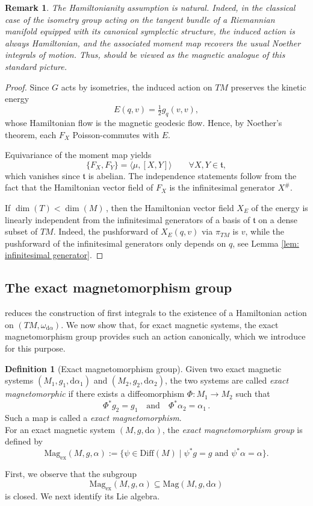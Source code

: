 \documentclass[11pt,reqno]{amsart}
\theoremstyle{plain}
\newtheorem{rem}[thm]{Remark}
\theoremstyle{definition}
\newtheorem{defn}[thm]{Definition}
\numberwithin{equation}{section}
\def\d{\delta}
\def\d{\delta}
\def\d{{\mathrm{d}}}
\def\Diff{\mathrm{Diff}}
\begin{document}
\begin{rem}
The Hamiltonianity assumption is natural. Indeed, in the classical case of the isometry group acting on the tangent bundle of a Riemannian manifold equipped with its canonical symplectic structure, the induced action is always Hamiltonian, and the associated moment map recovers the usual Noether integrals of motion. Thus,  should be viewed as the magnetic analogue of this standard picture.
\end{rem}
\begin{proof}
Since $G$ acts by isometries, the induced action on $TM$ preserves the kinetic energy
\[
E(q,v)=\tfrac12 g_q(v,v),
\]
whose Hamiltonian flow is the magnetic geodesic flow. Hence, by Noether's theorem, each $F_X$ Poisson-commutes with $E$.

Equivariance of the moment map yields
\[
\{F_X,F_Y\}=\langle \mu,[X,Y]\rangle \qquad \forall X,Y\in\mathfrak{t},
\]
which vanishes since $\mathfrak t$ is abelian. The independence statements follow from the fact that the Hamiltonian vector field of $F_X$ is the infinitesimal generator $X^\#$.

If $\dim(T) < \dim(M) \,$, then the Hamiltonian vector field $X_E$ of the energy is linearly independent from the infinitesimal generators of a basis of $\mathfrak{t}$ on a dense subset of $TM$. Indeed, the pushforward of $X_E(q,v)$ via $\pi_{TM}$ is $v$, while the pushforward of the infinitesimal generators only depends on $q$, see Lemma \ref{lem: infinitesimal generator}.
\end{proof}

\subsection{The exact magnetomorphism group}\label{subsection:The exact magnetomorphism group}

 reduces the construction of first integrals to the existence of a Hamiltonian action on $(TM,\omega_{\d\alpha})$. We now show that, for exact magnetic systems, the exact magnetomorphism group provides such an action canonically, which we introduce for this purpose.

\begin{defn}[Exact magnetomorphism group]
\label{defn: exact magn group}Given two exact magnetic systems $(M_1,g_1,\d\alpha_1)$ and $(M_2,g_2,\d\alpha_2)$, the two systems are called \emph{exact magnetomorphic} if there exists a diffeomorphism $\varPhi: M_1 \to M_2$ such that
\[
\varPhi^*g_2=g_1 \quad \text{and} \quad \varPhi^*\alpha_2=\alpha_1\,.
\]Such a map is called a \emph{exact magnetomorphism}.\\

\noindent For an exact magnetic system $(M,g,\d\alpha)$, the \emph{exact magnetomorphism group} is defined by
\[
\mathrm{Mag}_{\mathrm{ex}}(M,g,\alpha)
:=
\{\psi\in\Diff(M)\mid \psi^*g=g \text{ and } \psi^*\alpha=\alpha\}.
\]
\end{defn}
\medskip
First, we observe that the subgroup
\[
\mathrm{Mag}_{\mathrm{ex}}(M,g,\alpha)\subseteq \mathrm{Mag}(M,g,\d\alpha)
\]
is closed. We next identify its Lie algebra.
\end{document}
